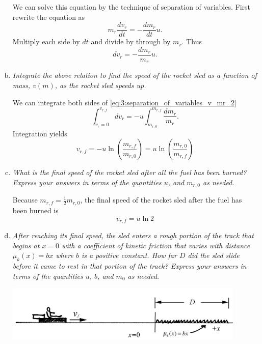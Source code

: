 \documentclass[solutions]{esg8012exam}
\begin{document}
\begin{enumerate}[(a)]
      We can solve this equation by the technique of separation of variables.  First rewrite the equation as
      \begin{equation} m_r \frac{dv_r }{dt}=-\frac{dm_r }{dt}u. \label{eq:3:separation_of_variables_v_mr_1} \end{equation}
      Multiply each side by $dt$ and divide by through by $m_r $. Thus
      \begin{equation} dv_r =-\frac{dm_r }{m_r }u. \label{eq:3:separation_of_variables_v_mr_2} \end{equation}
    \item \emph{Integrate the above relation to find the speed of the rocket sled as a function of mass, $v(m)$, as the rocket sled speeds up.} \par
      We can integrate both sides of \autoref{eq:3:separation_of_variables_v_mr_2}
      \begin{equation} \int_{v_r =0}^{v_{r,f} } {dv_r } =-u\int_{m_{r,0} }^{m_{r,f}} {\frac{dm_r }{m_r }} . \label{eq:3:integration_vr_mr} \end{equation}
      Integration yields
      \begin{equation} v_{r,f} =-u\ln \left( {\frac{m_{r,f} }{m_{r,0} }} \right)=u\ln \left( {\frac{m_{r,0} }{m_{r,f} }} \right) \label{eq:3:vrf}\end{equation}
    \item \emph{What is the final speed of the rocket sled after all the fuel has been burned? Express your answers in terms of the quantities $u$, and $m_{r,0}$ as needed.} \par
      Because $m_{r,f} =\frac12m_{r,0}$, the final speed of the rocket sled after the fuel has been burned is
      \begin{equation} v_{r,f} =u\ln 2 \label{eq:3:vf_u} \end{equation}
    \item \emph{After reaching its final speed, the sled enters a rough portion of the track that begins at $x=0$ with a coefficient of kinetic friction that varies with distance $\mu_k (x)=bx$ where $b$ is a positive constant. How far $D$ did the sled slide before it came to rest in that portion of the track? Express your answers in terms of the quantities $u$, $b$, and $m_0$ as needed.} \par
      \begin{center}\includegraphics[width=0.9\textwidth]{exam2_s3_3}\end{center}

\end{enumerate}
\end{document}

